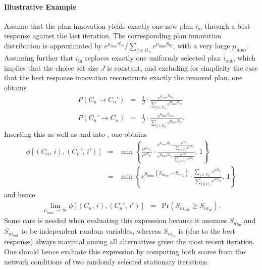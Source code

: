 \paragraph*{Illustrative Example}
Assume that the plan innovation yields exactly
one new plan $i_{\text{in}}$ through a best-response
%
%
against the
last iteration. The corresponding plan innovation distribution is
approximated by $e^{\mu_{\text{inno}}S_{ni}}/\sum_{j\in \mathcal{U}_n}e^{\mu_{\text{inno}}S_{nj}}$,
with a very large $\mu_{\text{inno}}$. Assuming further that $i_{\text{in}}$
replaces exactly one uniformly selected plan $i_{\text{out}}$, 
which implies that the choice set size $J$ is constant, 
and excluding for simplicity the case that the best response innovation
reconstructs exactly the removed plan,
one obtains
\begin{eqnarray}
P(C_{n}\rightarrow C_{n}') & = & \frac{1}{J}\cdot\frac{e^{\mu_{\text{inno}}S_{ni_{\text{in}}}}}{\sum_{j\in \mathcal{U}_n}e^{\mu_{\text{inno}}S_{nj}}}\\
P(C_{n}'\rightarrow C_{n}) & = & \frac{1}{J}\cdot\frac{e^{\mu_{\text{inno}}S_{ni_{\text{out}}}}}{\sum_{j\in \mathcal{U}_n}e^{\mu_{\text{inno}}S_{nj}}}.
\end{eqnarray}
Inserting this as well as  and 
into , one obtains
\begin{eqnarray}
\phi[(C_{n},\, i),(C_{n}',\, i')] & = & 
\min\left\{ 
\frac{e^{\mu S_{ni'}}}{e^{\mu S_{ni}}}\cdot
\frac{{\displaystyle e^{\mu_{\text{inno}}S_{ni_{\text{out}}}}\frac{\displaystyle e^{\mu S_{ni}}}{\sum_{j\in C_{n}}\displaystyle e^{\mu S_{nj}}}}}
{{\displaystyle e^{\mu_{\text{inno}}S_{ni_{\text{in}}}}\frac{\displaystyle e^{\mu S_{ni'}}}{\sum_{j\in C_{n}'} \displaystyle e^{\mu S_{nj}}}}},\,1\right\} \\
 & = & 
 \min\left\{ 
 {\displaystyle e^{\mu_{\text{inno}}(S_{ni_{\text{out}}}-S_{ni_{\text{in}}})}} \cdot
 \frac{\sum_{j\in C_{n}'} \displaystyle e^{\mu S_{nj}}}{\sum_{j\in C_{n}} \displaystyle e^{\mu S_{nj}}},\,1\right\} 
\end{eqnarray}
and hence
\begin{eqnarray}
\lim_{\mu_{\text{inno}}\rightarrow\infty}
\phi[(C_{n},\, i),(C_{n}',\, i')] & = & \text{Pr}(S_{ni_{\text{out}}}\geq S_{ni_{\text{in}}}).
\end{eqnarray}
Some care is needed when evaluating this expression because it assumes
$S_{ni_{\text{in}}}$ and $S_{ni_{\text{out}}}$ to be independent
random variables, whereas $S_{ni_{\text{in}}}$ is (due to the best
response) always maximal among all alternatives given the most recent
iteration. One should hence evaluate this expression by computing
both scores from the network conditions of two
%
%
randomly selected stationary
iterations.

